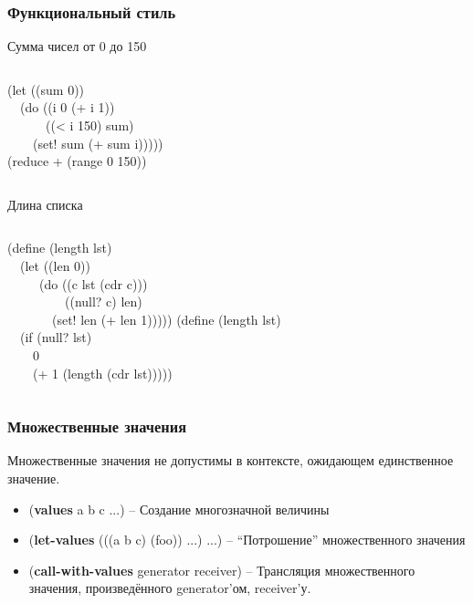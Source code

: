 \documentclass[16pt,pdf,unicode]{beamer}
\begin{document}
\begin{frame}
  \frametitle{Функциональный стиль}
  \begin{block}{Сумма чисел от 0 до 150}
    \begin{columns}
      (let ((sum 0))\\
      \ \ (do ((i 0 (+ i 1))\\
      \ \ \ \ \ \ ((< i 150) sum)\\
      \ \ \ \ (set! sum (+ sum i)))))\\
      (reduce + (range 0 150))
    \end{columns}
  \end{block}
  \begin{block}{Длина списка}
    \begin{columns}
      (define (length lst)\\
      \ \ (let ((len 0))\\
      \ \ \ \ \ (do ((c lst (cdr c)))\\
      \ \ \ \ \ \ \ \ \ ((null? c) len)\\
      \ \ \ \ \ \ \ (set! len (+ len 1))))) 
      (define (length lst)\\
      \ \ (if (null? lst)\\
      \ \ \ \ 0\\
      \ \ \ \ (+ 1 (length (cdr lst)))))
    \end{columns}
  \end{block}
\end{frame}

\begin{frame}
\frametitle{Множественные значения}
Множественные значения не допустимы в контексте, ожидающем единственное значение.
\begin{itemize}
  \item ({\bf values} a b c ...) -- Создание многозначной величины
  \item ({\bf let-values} (((a b c) (foo)) ...) ...) -- ``Потрошение'' множественного значения
  \item ({\bf call-with-values} generator receiver) -- Трансляция множественного значения, произведённого generator'ом, receiver'у.
\end{itemize}
\end{frame}
\end{document}

